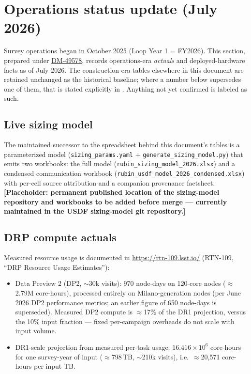 \section{Operations status update (July 2026)}\label{sec:ops2026}

Survey operations began in October 2025 (Loop Year 1 = FY2026). This section,
prepared under \href{https://rubinobs.atlassian.net/browse/DM-49578}{DM-49578},
records operations-era \emph{actuals} and deployed-hardware facts as of July
2026. The construction-era tables elsewhere in this document are retained
unchanged as the historical baseline; where a number below supersedes one of
them, that is stated explicitly in . Anything not yet
confirmed is labeled as such.

\subsection{Live sizing model}\label{sec:ops2026model}

The maintained successor to the spreadsheet behind this document's tables is a
parameterized model (\texttt{sizing\_params.yaml} +
\texttt{generate\_sizing\_model.py}) that emits two workbooks: the full model
(\texttt{rubin\_sizing\_model\_2026.xlsx}) and a condensed communication
workbook (\texttt{rubin\_usdf\_model\_2026\_condensed.xlsx}) with per-cell
source attribution and a companion provenance factsheet.
\textbf{[Placeholder: permanent published location of the sizing-model
repository and workbooks to be added before merge --- currently maintained in
the USDF sizing-model git repository.]}

\subsection{DRP compute actuals}\label{sec:ops2026compute}

Measured resource usage is documented in \url{https://rtn-109.lsst.io/}
(RTN-109, ``DRP Resource Usage Estimates''):

\begin{itemize}
\item Data Preview 2 (DP2, $\sim$30k visits): 970 node-days on 120-core
      nodes ($\approx$2.79M core-hours), processed entirely on Milano-generation
      nodes (per June 2026 DP2 performance metrics; an earlier figure of 650
      node-days is superseded). Measured DP2 compute is $\approx$17\% of the
      DR1 projection, versus the 10\% input fraction --- fixed per-campaign
      overheads do not scale with input volume.
\item DR1-scale projection from measured per-task usage: $16.416\times10^6$
      core-hours for one survey-year of input ($\approx$798\,TB,
      $\sim$210k visits), i.e.\ $\approx$20{,}571 core-hours per input TB.
\end{itemize}

